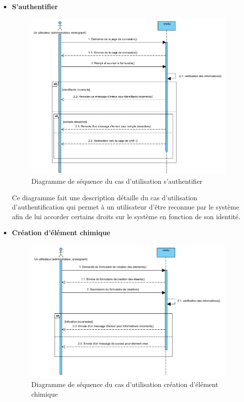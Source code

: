 \begin{itemize}
	\item \textbf{S’authentifier}

	      \begin{figure}[H]
		      \centering
		      \includegraphics[width=1\textwidth]{img/ucdAuth}
		      \caption{Diagramme de séquence du cas d'utilisation s’authentifier}
		      \label{fig:mesh1}
	      \end{figure}

	      Ce diagramme fait une description détaille du cas d’utilisation d’authentification qui permet à un utilisateur d’être reconnue par le système afin de lui accorder certains droits sur le système en fonction de son identité.

	\newpage
	\item \textbf{Création d’élément chimique}

	      \begin{figure}[H]
		      \centering
		      \includegraphics[width=1\textwidth]{img/ucdElCr}
		      \caption{Diagramme de séquence du cas d'utilisation création d’élément chimique}
		      \label{fig:mesh1}
	      \end{figure}


\end{itemize}
